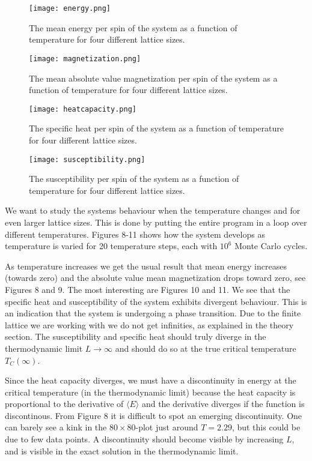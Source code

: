 \documentclass[english, 12pt]{article}
\begin{document}
\begin{figure}[hbt!]
\centering
\texttt{[image: energy.png]}
\caption{The mean energy per spin of the system as a function of temperature for four different lattice sizes.}
\end{figure}

\begin{figure}[hbt!]
\centering
\texttt{[image: magnetization.png]}
\caption{The mean absolute value magnetization per spin of the system as a function of temperature for four different lattice sizes.}
\end{figure}

\begin{figure}[hbt!]
\centering
\texttt{[image: heatcapacity.png]}
\caption{The specific heat per spin of the system as a function of temperature for four different lattice sizes.}
\end{figure}

\begin{figure}[hbt!]
\centering
\texttt{[image: susceptibility.png]}
\caption{The susceptibility per spin of the system as a function of temperature for four different lattice sizes.}
\end{figure}


We want to study the systems behaviour when the temperature changes and for even larger lattice sizes. This is done by putting the entire program in a loop over different temperatures. Figures 8-11 shows how the system develops as temperature is varied for 20 temperature steps, each with $10^6$ Monte Carlo cycles.

As temperature increases we get the usual result that mean energy increases (towards zero) and the absolute value mean magnetization drops toward zero, see Figures 8 and 9. The most interesting are Figures 10 and 11. We see that the specific heat and susceptibility of the system exhibits divergent behaviour. This is an indication that the system is undergoing a phase transition. Due to the finite lattice we are working with we do not get infinities, as explained in the theory section. The susceptibility and specific heat should truly diverge in the thermodynamic limit $L\rightarrow \infty$ and should do so at the true critical temperature $T_C(\infty)$.

Since the heat capacity diverges, we must have a discontinuity in energy at the critical temperature (in the thermodynamic limit) because the heat capacity is proportional to the derivative of $\langle E\rangle$ and the derivative diverges if the function is discontinous. From Figure 8 it is difficult to spot an emerging discontinuity. One can barely see a kink in the $80\times80$-plot just around $T=2.29$, but this could be due to few data points. A discontinuity should become visible by increasing $L$, and is visible in the exact solution in the thermodynamic limit.
\end{document}
